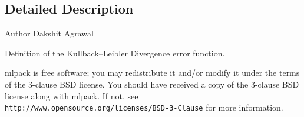 \subsection{Detailed Description}
\begin{DoxyAuthor}{Author}
Dakshit Agrawal
\end{DoxyAuthor}
Definition of the Kullback–\+Leibler Divergence error function.

mlpack is free software; you may redistribute it and/or modify it under the terms of the 3-\/clause B\+SD license. You should have received a copy of the 3-\/clause B\+SD license along with mlpack. If not, see {\tt http\+://www.\+opensource.\+org/licenses/\+B\+S\+D-\/3-\/\+Clause} for more information. 